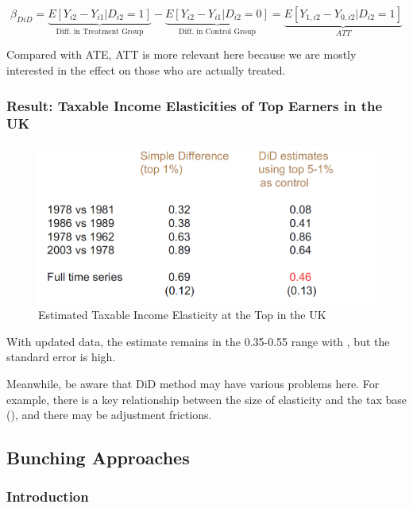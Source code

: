                 \begin{equation*}
                    \beta_{DiD}=\underbrace{ E[Y_{i2}-Y_{i1}|D_{i2}=1] }_{ \text{Diff. in Treatment Group} }-\underbrace{ E[Y_{i2}-Y_{i1}|D_{i2}=0] }_{ \text{Diff. in Control Group} }=\underbrace{E[Y_{1,i2}-Y_{0,i2}|D_{i2}=1]}_{ATT}
                \end{equation*}
                
                Compared with ATE, ATT is more relevant here because we are mostly interested in the effect on those who are actually treated.


            \subsubsection{Result: Taxable Income Elasticities of Top Earners in the UK}

                \begin{figure}[H]
                    \centering
                    \includegraphics[width=4.5in]{images/ch13/13_DID_3.png}
                    \caption{Estimated Taxable Income Elasticity at the Top in the UK}
                \end{figure}

                With updated data, the estimate remains in the 0.35-0.55 range with , but the standard error is high.

                Meanwhile, be aware that DiD method may have various problems here. For example, there is a key relationship between the size of elasticity and the tax base (\cite{slemrod_optimal_2002}), and there may be adjustment frictions.

        \subsection{Bunching Approaches}

            \subsubsection{Introduction}

